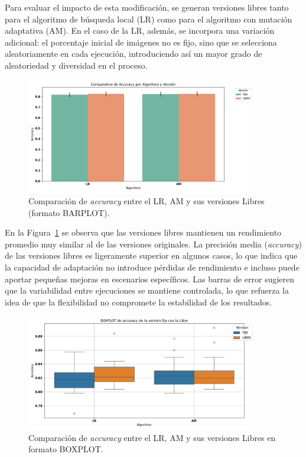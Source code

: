 Para evaluar el impacto de esta modificación, se generan versiones libres tanto para el algoritmo de búsqueda local (LR)
como para el algoritmo con mutación adaptativa (AM).
En el caso de la LR, además, se incorpora una variación adicional: el porcentaje inicial de imágenes no es fijo,
sino que se selecciona aleatoriamente en cada ejecución, introduciendo así un mayor grado de aleatoriedad y diversidad en el proceso.


\begin{figure}[htp]
    \centering
    \includegraphics[width=0.9\textwidth]{imagenes/evaluaciones/libres/barplot_por_algoritmo}
    \caption{Comparación de \textit{accuracy} entre el LR, AM y sus versiones Libres (formato BARPLOT).}
    \label{fig:barplot_por_algoritmo-libres}
\end{figure}

En la Figura~\ref{fig:barplot_por_algoritmo-libres} se observa que las versiones libres mantienen un rendimiento promedio muy similar al de las versiones originales.
La precisión media (\textit{accuracy}) de las versiones libres es ligeramente superior en algunos casos,
lo que indica que la capacidad de adaptación no introduce pérdidas de rendimiento e incluso puede aportar pequeñas mejoras en escenarios específicos.
Las barras de error sugieren que la variabilidad entre ejecuciones se mantiene controlada,
lo que refuerza la idea de que la flexibilidad no compromete la estabilidad de los resultados.


\begin{figure}[htp]
    \centering
    \includegraphics[width=0.9\textwidth]{imagenes/evaluaciones/libres/boxplot_por_algoritmo}
    \caption{Comparación de \textit{accuracy} entre el LR, AM y sus versiones Libres en formato BOXPLOT.}
    \label{fig:boxplot_por_algoritmo-libres}
\end{figure}

